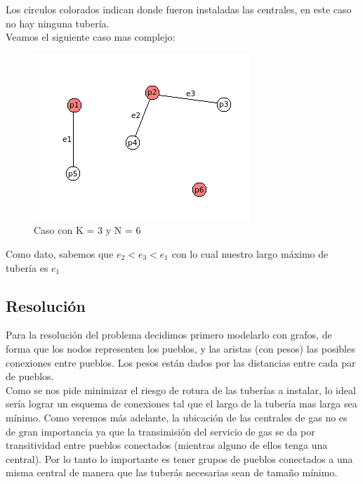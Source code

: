 Los circulos colorados indican donde fueron instaladas las centrales, en este caso no hay ninguna tuber\'ia.\\

Veamos el siguiente caso mas complejo: 

\begin{figure}[h]
\begin{center}
\includegraphics[scale=0.7]{./img/ej2_explicacion2.png}
\caption{Caso con K = 3 y N = 6}
\end{center}
\end{figure}

Como dato, sabemos que $e_2 < e_3 < e_1$ con lo cual nuestro largo m\'aximo de tuber\'ia es $e_1$

\subsection{Resoluci\'on}

Para la resoluci\'on del problema decidimos primero modelarlo con grafos, de forma que los nodos representen los pueblos, y las aristas (con pesos) las posibles conexiones entre pueblos. Los pesos est\'an dados por las distancias entre cada par de pueblos. \\

Como se nos pide minimizar el riesgo de rotura de las tuber\'ias a instalar, lo ideal ser\'ia lograr un esquema de conexiones tal que el largo de la tuber\'ia mas larga sea m\'inimo. Como veremos m\'as adelante, la ubicaci\'on de las centrales de gas no es de gran importancia ya que la transimisi\'on del servicio de gas se da por transitividad entre pueblos conectados (mientras alguno de ellos tenga una central). Por lo tanto lo importante es tener grupos de pueblos conectados a una misma central de manera que las tuber\'as necesarias sean de tama\~no m\'inimo. \\

